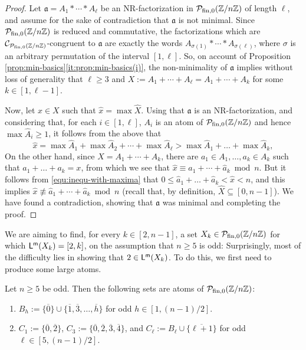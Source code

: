 \begin{proof}
Let $\mathfrak{a} = A_1 \ast \cdots \ast A_\ell$ be an NR-factorization in $\mathcal P_{\textrm{fin},0}(\mathbb{Z}/n\mathbb{Z})$ of length $\ell$, and assume for the sake of contradiction that $\mathfrak a$ is not minimal. Since
$\mathcal{P}_{\textrm{fin},0}(\mathbb{Z}/n\mathbb{Z})$ is reduced and commutative, the factorizations which are $\mathcal{C}_{\mathcal{P}_{\textrm{fin},0}(\mathbb{Z}/n\mathbb{Z})}$-congruent to $\mathfrak{a}$ are exactly the words $A_{\sigma(1)} \ast \cdots \ast A_{\sigma(\ell)}$, where $\sigma$ is an arbitrary permutation of the interval $[ 1, \ell ]$.
So, on account of Proposition \ref{prop:min-basics}\ref{it:prop:min-basics(i)}, the non-minimality of $\mathfrak{a}$ implies without loss of generality that $\ell \ge 3$ and $
X := A_1 + \cdots + A_\ell = A_1 + \cdots + A_k$ for some $k \in [ 1, \ell-1 ]$. 

Now, let $x \in X$ such that $\hat{x} = \max \hat{X}$. Using that $\mathfrak a$ is an NR-factorization, and considering that, for each $i \in [ 1, \ell ]$, $A_i$ is an atom of $\mathcal P_{\textrm{fin},0}(\mathbb{Z}/n\mathbb{Z})$ and hence $\max \hat{A}_i \ge 1$, it follows from the above that
\begin{equation}\label{equ:inequ-with-maxima}
\hat{x} = \max\hat{A}_1+\max\hat{A}_2+\cdots+\max\hat{A}_\ell > \max\hat{A}_1 + \dots + \max\hat{A}_k,
\end{equation}
On the other hand, since $X = A_1 + \cdots + A_k$, there are $a_1 \in A_1,\dots, a_k \in A_k$ such that $a_1+\dots+ a_k = x$, from which we see that $\hat{x} \equiv \hat{a}_1 + \cdots + \hat{a}_k \bmod n$. But it follows from \eqref{equ:inequ-with-maxima} that
$
0 \le \hat{a}_1+\dots+ \hat{a}_k < \hat{x} < n$, and this implies $\hat{x} \not\equiv \hat{a}_1 + \cdots + \hat{a}_k \bmod n$ (recall that, by definition, $\hat{X} \subseteq [ 0, n-1 ]$). We have found a contradiction, showing that $\mathfrak a$ was minimal and completing the proof.
\end{proof}


We are aiming to find, for every $k\in[ 2, n-1]$, a set $X_k\in\mathcal{P}_{\textrm{fin},0}(\mathbb{Z}/n\mathbb{Z})$ for which $\mathsf{L}^{\mathsf{m}}(X_k) = [ 2, k ]$, on the assumption that $n\ge 5$ is odd:
Surprisingly, most of the difficulty lies in showing that $2\in \mathsf{L}^{\mathsf{m}}(X_k)$.
To do this, we first need to produce some large atoms.

\begin{prop}\label{large-atom-construction}
Let $n\ge 5$ be odd.
Then the following sets are atoms of $\mathcal P_{\textrm{fin},0}(\mathbb{Z}/n\mathbb{Z})$:
\begin{enumerate}[label={\rm (\roman{*})}]
\item\label{it:large-atom-construction(i)} $B_h := \bigl\{\overline{0}\} \cup \{\overline{1},\overline{3},\dots, \overline{h}\bigr\}$ for odd $h\in [ 1,(n-1)/2 ]$.
\item\label{it:large-atom-construction(ii)} $C_1 := \bigl\{\overline{0}, \overline{2}\bigr\}$, $C_3 := \bigl\{\overline{0},\overline{2},\overline{3},\overline{4}\bigr\}$, and $C_\ell := B_\ell\cup\bigl\{\overline{\ell+1}\bigr\}$ for odd $\ell\in [ 5, (n-1)/2 ]$.
\end{enumerate}
\end{prop}

